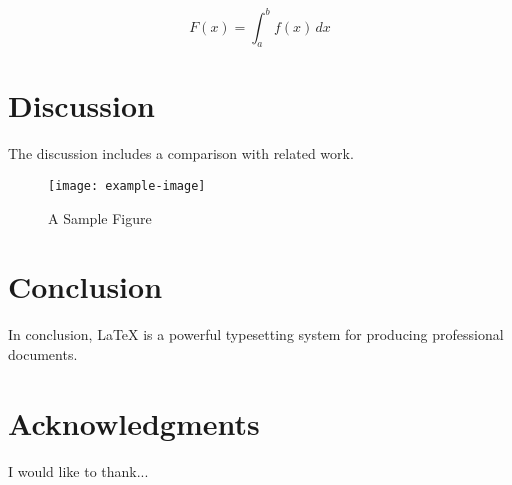 \documentclass{article}
\begin{document}
    \begin{equation}
        \label{eq:analysis}
        F(x) = \int_{a}^{b} f(x) \, dx
    \end{equation}

    \section{Discussion}
    \label{sec:discussion}
    The discussion includes a comparison with related work.

    \begin{figure}[htb]
        \centering
        \texttt{[image: example-image]}
        \caption{A Sample Figure}
        \label{fig:sample}
    \end{figure}

    \lipsum[4-5]

    \section{Conclusion}
    \label{sec:conclusion}
    In conclusion, LaTeX is a powerful typesetting system for producing professional documents.

    \section*{Acknowledgments}
    I would like to thank...

    
    
\end{document}
